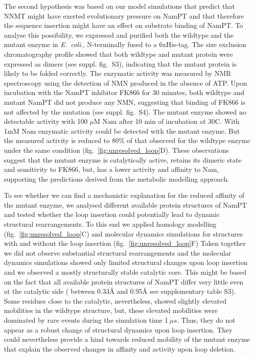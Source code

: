 The second hypothesis was  based on our model simulations that predict that NNMT might have exerted evolutionary pressure on  NamPT and that therefore the sequence insertion might have an effect on substrate binding of NamPT.  To analyse this possibility, we expressed and purified  both the wildtype and the mutant enzyme in \textit{E.~coli}., N-terminally fused to a 6xHis-tag. The size exclusion chromatography profile showed that both wildtype and mutant protein were expressed as dimers (see suppl. fig.~S3), indicating that the  mutant protein is likely to be folded correctly. The enzymatic activity was measured by NMR spectroscopy using the detection of NMN produced in the absence of ATP. Upon incubation with the NamPT inhibitor FK866 \cite{Hasmann2003} for 30 minutes, both wildtype and mutant NamPT did not produce any NMN, suggesting that binding of FK866 is not affected by the mutation (see suppl. fig.~S4). The mutant enzyme showed no detectable activity with 100 $\mu$M  Nam after 10 min of incubation at 30\textdegree{}C. With 1mM Nam enzymatic activity could be detected with the mutant enzyme. But the measured activity is reduced to 80\% of that observed for the wildtype enzyme under the same condition (fig.~\ref{fig:unresolved_loop}D). These observations suggest that the mutant enzyme is catalytically active, retains its dimeric state and sensitivity to FK866, but, has a  lower activity and affinity to Nam, supporting the predictions derived from the metabolic modelling approach. 

To see whether we can find a mechanistic explanation for the reduced affinity of the mutant enzyme, we analysed different available protein structures of NamPT and tested whether  the loop insertion could potentially lead to dynamic structural rearrangements. To this end we applied homology modelling (fig.~\ref{fig:unresolved_loop}C) and molecular dynamics simulations for structures with and without the loop insertion (fig.~\ref{fig:unresolved_loop}F) Taken together we did not observe substantial structural rearrangements and the molecular dynamics simulations showed only limited structural changes upon loop insertion and we observed a mostly structurally stable catalytic core. This might be based on the fact that  all available protein structures of NamPT differ very little even at the catalytic side ( between 0.33Å and 0.95Å see supplementary table S3). Some residues close to the catalytic, nevertheless, showed slightly elevated mobilities in the wildtype structure, but, these elevated mobilities were dominated by rare events during the simulation time 1$~\mu s$. Thus, they do not appear as a robust change of structural dynamics upon loop insertion. They could nevertheless provide a hind towards reduced mobility of the mutant enzyme that explain the observed changes in affinity and activity upon loop deletion.




